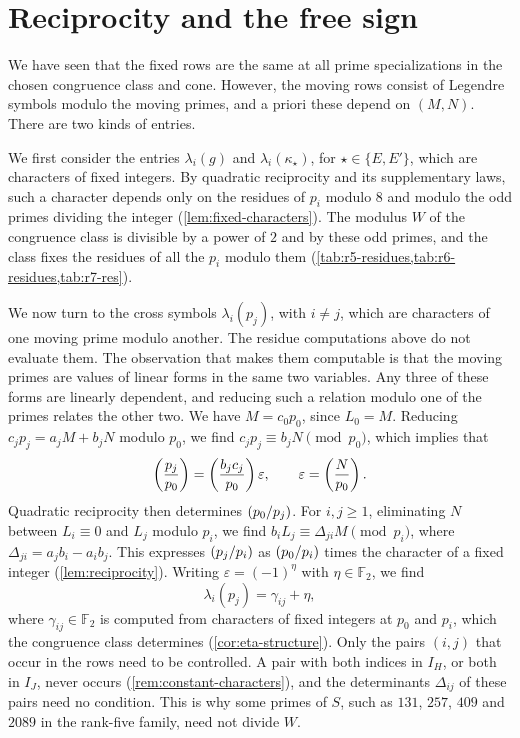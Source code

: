 \documentclass[12pt,oneside,openany]{book}
\theoremstyle{definition}
\theoremstyle{plain}
\numberwithin{equation}{chapter}
\theoremstyle{plain}
\theoremstyle{definition}
\theoremstyle{remark}
\newcommand{\F}{\mathbb F}
\newcommand{\leg}[2]{\mathchoice{\left(\frac{#1}{#2}\right)}{(#1/#2)}{(#1/#2)}{(#1/#2)}}
\newcommand{\eps}{\varepsilon}
\begin{document}
\section{Reciprocity and the free sign}\label{sec:overview-sign}

We have seen that the fixed rows are the same at all prime specializations in the chosen congruence class and cone. However, the moving rows consist of Legendre symbols modulo the moving primes, and a priori these depend on $(M,N)$. There are two kinds of entries.

We first consider the entries $\lambda_i(g)$ and $\lambda_i(\kappa_\star)$, for $\star\in\{E,E'\}$, which are characters of fixed integers. By quadratic reciprocity and its supplementary laws, such a character depends only on the residues of $p_i$ modulo $8$ and modulo the odd primes dividing the integer (\cref{lem:fixed-characters}). The modulus $W$ of the congruence class is divisible by a power of $2$ and by these odd primes, and the class fixes the residues of all the $p_i$ modulo them (\cref{tab:r5-residues,tab:r6-residues,tab:r7-res}).

We now turn to the cross symbols $\lambda_i(p_j)$, with $i\ne j$, which are characters of one moving prime modulo another. The residue computations above do not evaluate them. The observation that makes them computable is that the moving primes are values of linear forms in the same two variables. Any three of these forms are linearly dependent, and reducing such a relation modulo one of the primes relates the other two. We have $M=c_0p_0$, since $L_0=M$. Reducing $c_jp_j=a_jM+b_jN$ modulo $p_0$, we find $c_jp_j\equiv b_jN\pmod{p_0}$, which implies that
\begin{equation*}
\leg{p_j}{p_0}=\leg{b_jc_j}{p_0}\eps,\qquad\eps=\leg N{p_0}.
\end{equation*}
Quadratic reciprocity then determines $\leg{p_0}{p_j}$.
For $i,j\ge1$, eliminating $N$ between $L_i\equiv0$ and $L_j$ modulo $p_i$, we find $b_iL_j\equiv\Delta_{ji}M\pmod{p_i}$, where $\Delta_{ji}=a_jb_i-a_ib_j$. This expresses $\leg{p_j}{p_i}$ as $\leg{p_0}{p_i}$ times the character of a fixed integer (\cref{lem:reciprocity}). Writing $\eps=(-1)^\eta$ with $\eta\in\F_2$, we find
\begin{equation*}
\lambda_i(p_j)=\gamma_{ij}+\eta,
\end{equation*}
where $\gamma_{ij}\in\F_2$ is computed from characters of fixed integers at $p_0$ and $p_i$, which the congruence class determines (\cref{cor:eta-structure}). Only the pairs $(i,j)$ that occur in the rows need to be controlled. A pair with both indices in $I_H$, or both in $I_J$, never occurs (\cref{rem:constant-characters}), and the determinants $\Delta_{ij}$ of these pairs need no condition. This is why some primes of $S$, such as $131$, $257$, $409$ and $2089$ in the rank-five family, need not divide $W$.
\end{document}

